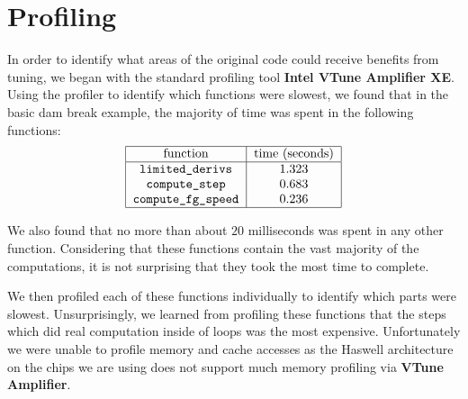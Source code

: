 \section{Profiling}

In order to identify what areas of the original  code could receive benefits from tuning, we began with the standard profiling tool \textbf{Intel VTune Amplifier XE}. Using the profiler to identify which functions were slowest, we found that in the basic dam break example, the majority of time was spent in the following functions:
$$
\begin{tabular}{|c|c|}
	\hline
	function & time (seconds) \\
	\hline
	\ttt{limited\_derivs} & 1.323 \\
	\ttt{compute\_step} & 0.683 \\
	\ttt{compute\_fg\_speed} & 0.236 \\
	\hline
\end{tabular}
$$

We also found that no more than about $20$ milliseconds was spent in any other function.
Considering that these functions contain the vast majority of the computations, it is not surprising that they took the most time to complete.

We then profiled each of these functions individually to identify which parts were slowest. Unsurprisingly, we learned from profiling these functions that the steps which did real computation inside of  loops was the most expensive. Unfortunately we were unable to profile memory and cache accesses as the Haswell architecture on the chips we are using does not support much memory profiling via \textbf{VTune Amplifier}.